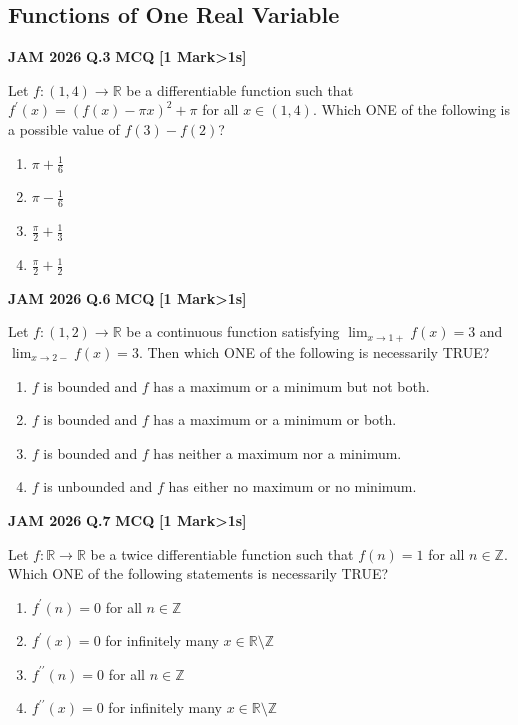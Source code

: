 \documentclass[11pt,a4paper]{article}
\newcommand{\pyqheader}[4]{%
    \noindent\begin{tcolorbox}[
        colback=badgebg,
        colframe=secondary,
        arc=2mm,
        boxrule=0.6pt,
        top=1.5mm,bottom=1.5mm,left=2mm,right=2mm
    ]
        \textbf{\textcolor{primary}{JAM #1}} \hfill \textbf{Q.#2} \hfill \textsc{\textbf{#3}} \hfill \textbf{[#4 Mark\ifnum#4>1s\fi]}
    \end{tcolorbox}\vspace{-1mm}
}
\begin{document}
\subsection{Functions of One Real Variable}

\pyqheader{2026}{3}{MCQ}{1}
Let $f:(1,4)\rightarrow\mathbb{R}$ be a differentiable function such that $f^{\prime}(x)=(f(x)-\pi x)^{2}+\pi$ for all $x\in(1,4)$. Which ONE of the following is a possible value of $f(3)-f(2)$?
\begin{enumerate}[label=(\Alph*)]
    \item $\pi+\frac{1}{6}$
    \item $\pi-\frac{1}{6}$
    \item $\frac{\pi}{2}+\frac{1}{3}$
    \item $\frac{\pi}{2}+\frac{1}{2}$
\end{enumerate}

\pyqheader{2026}{6}{MCQ}{1}
Let $f:(1,2)\rightarrow\mathbb{R}$ be a continuous function satisfying $\lim_{x\rightarrow 1+}f(x)=3$ and $\lim_{x\rightarrow 2-}f(x)=3$. Then which ONE of the following is necessarily TRUE?
\begin{enumerate}[label=(\Alph*)]
    \item $f$ is bounded and $f$ has a maximum or a minimum but not both.
    \item $f$ is bounded and $f$ has a maximum or a minimum or both.
    \item $f$ is bounded and $f$ has neither a maximum nor a minimum.
    \item $f$ is unbounded and $f$ has either no maximum or no minimum.
\end{enumerate}

\pyqheader{2026}{7}{MCQ}{1}
Let $f:\mathbb{R}\rightarrow\mathbb{R}$ be a twice differentiable function such that $f(n)=1$ for all $n\in\mathbb{Z}$. Which ONE of the following statements is necessarily TRUE?
\begin{enumerate}[label=(\Alph*)]
    \item $f^{\prime}(n)=0$ for all $n\in\mathbb{Z}$
    \item $f^{\prime}(x)=0$ for infinitely many $x\in\mathbb{R}\setminus\mathbb{Z}$
    \item $f^{\prime\prime}(n)=0$ for all $n\in\mathbb{Z}$
    \item $f^{\prime\prime}(x)=0$ for infinitely many $x\in\mathbb{R}\setminus\mathbb{Z}$
\end{enumerate}
\end{document}
